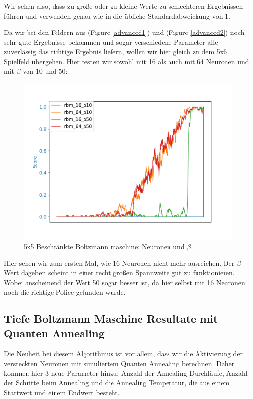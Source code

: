 Wir sehen also, dass zu große oder zu kleine Werte zu schlechteren Ergebnissen führen und verwenden genau wie in \citep{crawford2019reinforcement} die übliche Standardabweichung von 1.

Da wir bei den Feldern aus (Figure \ref{advanced1}) und (Figure \ref{advanced2}) noch sehr gute Ergebnisse bekommen und sogar verschiedene Parameter alle zuverlässig das richtige Ergebnis liefern, wollen wir hier gleich zu dem 5x5 Spielfeld übergehen. Hier testen wir sowohl mit 16 als auch mit 64 Neuronen und mit $\beta$ von 10 und 50:

\begin{figure}[H]
\centering
\includegraphics[width=\textwidth]{Figures/rbm8_5x5_rbm_16_b10_rbm_64_b10_rbm_16_b50_rbm_64_b50.png}
\caption{5x5 Beschränkte Boltzmann maschine: Neuronen und $\beta$}
\label{rbm5}
\end{figure}

Hier sehen wir zum ersten Mal, wie 16 Neuronen nicht mehr ausreichen. Der $\beta$-Wert dageben scheint in einer recht großen Spannweite gut zu funktionieren. Wobei anscheinend der Wert 50 sogar besser ist, da hier selbst mit 16 Neuronen noch die richtige Police gefunden wurde.

\subsection{Tiefe Boltzmann Maschine Resultate mit Quanten Annealing}
\label{subsec:dbm_r}

Die Neuheit bei diesem Algorithmus ist vor allem, dass wir die Aktivierung der versteckten Neuronen mit simuliertem Quanten Annealing berechnen. Daher kommen hier 3 neue Parameter hinzu: Anzahl der Annealing-Durchläufe, Anzahl der Schritte beim Annealing und die Annealing Temperatur, die aus einem Startwert und einem Endwert besteht. 

